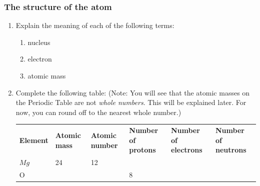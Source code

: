             \subsubsection{  The structure of the atom
      }
            \nopagebreak
      \label{m38745*id256225}\begin{enumerate}[noitemsep, label=\textbf{\arabic*}. ] 
            \label{m38745*uid15}\item Explain the meaning of each of the following terms:
\label{m38745*id256240}\begin{enumerate}[noitemsep, label=\textbf{\alph*}. ] 
            \label{m38745*uid16}\item nucleus
\label{m38745*uid17}\item electron
\label{m38745*uid18}\item atomic mass
\end{enumerate}
                \label{m38745*uid19}\item Complete the following table: (Note: You will see that the atomic masses on the Periodic Table are not \textsl{whole numbers}. This will be explained later. For now, you can round off to the nearest whole number.)
          \begin{table}[H]
        \begin{center}
      \label{m38745*id256298}
    \noindent
      \tablelasttail{}
      \begin{xtabular}[t]{|l|l|l|l|l|l|}\hline
        \textbf{Element} &
        \textbf{Atomic mass} &
        \textbf{Atomic number} &
        \textbf{Number of protons} &
        \textbf{Number of electrons} &
        \textbf{Number of neutrons}%
     \tabularnewline{}
        $Mg$ &
        24 &
        12 &
         &
         &
     \tabularnewline{}
        $\mathrm{O}$ &
         &
         &
        8 &

\end{xtabular}
\end{center}
\end{table}
\end{enumerate}
